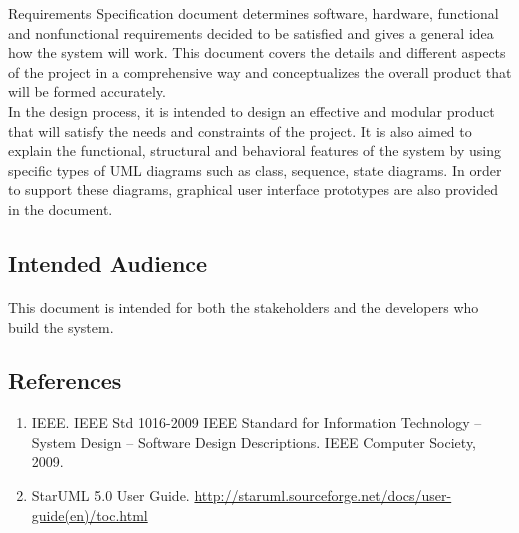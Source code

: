 	Requirements Specification document determines software, hardware, functional and nonfunctional requirements decided to be satisfied and gives a general idea how the system will work. This document covers the details and different aspects of the project in a comprehensive way and conceptualizes the overall product that will be formed accurately.\\
    
    In the design process, it is intended to design an effective and modular product that will satisfy the needs and constraints of the project. It is also aimed to explain the functional, structural and behavioral features of the system by using specific types of UML diagrams such as class, sequence, state diagrams. In order to support these diagrams, graphical user interface prototypes are also provided in the document.\\
\skipsubsection


\subsection{Intended Audience}
\paragraph{}
\normalsize
This document is intended for both the stakeholders and the developers who build the system.\\
\skipsubsection

\subsection{References}
	\begin{enumerate}
		\item IEEE. IEEE Std 1016-2009 IEEE Standard for Information Technology – System Design – Software Design Descriptions. IEEE Computer Society, 2009.
		\item StarUML 5.0 User Guide. \url{http://staruml.sourceforge.net/docs/user-guide(en)/toc.html}
	\end{enumerate}
\skipsubsection
